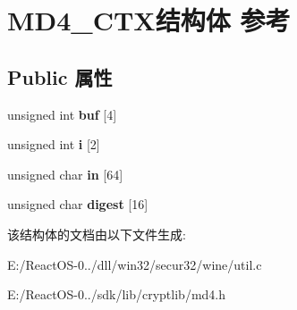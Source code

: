 \hypertarget{struct_m_d4___c_t_x}{}\section{M\+D4\+\_\+\+C\+T\+X结构体 参考}
\label{struct_m_d4___c_t_x}
\subsection*{Public 属性}
\begin{DoxyCompactItemize}
\item 
\mbox{\label{struct_m_d4___c_t_x_ac03516828aaa02e7e3de89d3522f3594}} 
unsigned int {\bfseries buf} \mbox{[}4\mbox{]}
\item 
\mbox{\label{struct_m_d4___c_t_x_a5cfa87cb644320c8e290a0fe7b888e46}} 
unsigned int {\bfseries i} \mbox{[}2\mbox{]}
\item 
\mbox{\label{struct_m_d4___c_t_x_ae094d2700f510e4feb04b90ed92ba2db}} 
unsigned char {\bfseries in} \mbox{[}64\mbox{]}
\item 
\mbox{\label{struct_m_d4___c_t_x_a4cdec440a56a250f0e56192b505df174}} 
unsigned char {\bfseries digest} \mbox{[}16\mbox{]}
\end{DoxyCompactItemize}


该结构体的文档由以下文件生成\+:\begin{DoxyCompactItemize}
\item 
E\+:/\+React\+O\+S-\/0../dll/win32/secur32/wine/util.\+c\item 
E\+:/\+React\+O\+S-\/0../sdk/lib/cryptlib/md4.\+h\end{DoxyCompactItemize}
